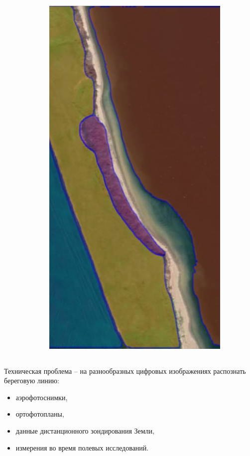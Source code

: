 \documentclass[10pt]{beamer}
\begin{document}
\begin{frame}
\begin{columns}
\begin{column}{0.25\linewidth}
    \end{column}
    \begin{column}{0.25\linewidth}
      \includegraphics[width=1\linewidth]{sa-source-ge.png}
    \end{column}
  \end{columns}
  Техническая проблема -- на разнообразных цифровых изображениях распознать береговую линию:
  \begin{itemize}
  \item аэрофотоснимки,
  \item ортофотопланы,
  \item данные дистанционного зондирования Земли,
  \item измерения во время полевых исследований.
  \end{itemize}
\end{frame}
\end{document}

